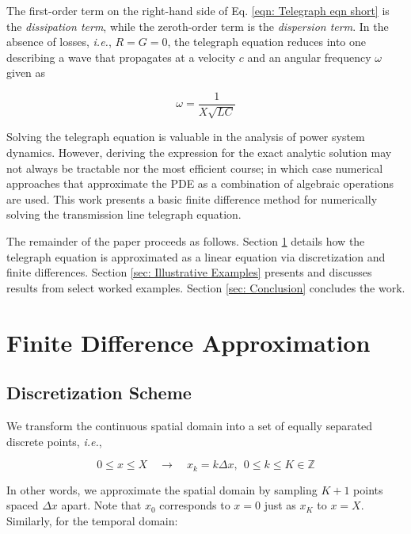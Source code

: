 \documentclass{article}
\begin{document}
The first-order term on the right-hand side of Eq. \ref{eqn: Telegraph eqn short} is the \textit{dissipation term},
while the zeroth-order term is the \textit{dispersion term}.
In the absence of losses, \textit{i.e.}, $R=G=0$, the telegraph equation reduces into one describing a wave
that propagates at a velocity $c$ and an angular frequency $\omega$ given as

\begin{equation}
   \label{eqn: Omega}
   \omega = \frac{1}{X \sqrt{LC}}
\end{equation}

Solving the telegraph equation is valuable in the analysis of power system dynamics.
However, deriving the expression for the exact analytic solution may not always be tractable nor the most efficient course;
in which case numerical approaches that approximate the PDE as a combination of algebraic operations are used.
This work presents a basic finite difference method for numerically solving the transmission line telegraph equation.

The remainder of the paper proceeds as follows.
Section \ref{sec: Finite Difference Approximation} details how the telegraph equation is approximated as a linear equation via discretization and finite differences.
Section \ref{sec: Illustrative Examples} presents and discusses results from select worked examples.
Section \ref{sec: Conclusion} concludes the work.

\section{Finite Difference Approximation}
\label{sec: Finite Difference Approximation}

\subsection{Discretization Scheme}
\label{subsec: Discretization Scheme}

We transform the continuous spatial domain into a set of equally separated discrete points, \textit{i.e.},

\begin{equation*}
   0 \leq x \leq X \quad
   \longrightarrow \quad
   x_{k} = k \Delta x,\ \ 0 \leq k \leq K \in \mathbb{Z}
\end{equation*}

In other words, we approximate the spatial domain by sampling $K+1$ points spaced $\Delta x$ apart.
Note that $x_{0}$ corresponds to $x=0$ just as $x_{K}$ to $x=X$.
Similarly, for the temporal domain:
\end{document}
